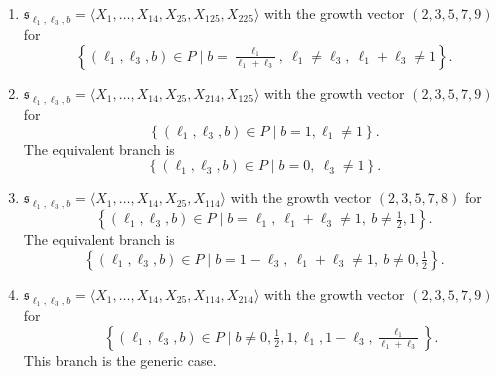 \documentclass{amsart}
\theoremstyle{plain}
\theoremstyle{definition}
\theoremstyle{remark}
\newcommand{\mfk}[1]{\mathfrak{#1}}
\begin{document}
\begin{enumerate}[label=\arabic*)]
\begin{equation*}
        \end{equation*}
        The equivalent branch is
        \[ \left\{ (\ell_1,\ell_3,b) \in P \mid b = 0,\ \ell_3 = 1 \right\}. \]
    \item $\mfk{s}_{\ell_1,\ell_3,b} = \langle X_1, \dots, X_{14}, X_{25}, X_{125}, X_{225} \rangle$ with the growth vector $(2,3,5,7,9)$ for
        \begin{equation*}
            \left\{ (\ell_1,\ell_3,b) \in P \mid b = \tfrac{\ell_1}{\ell_1+\ell_3},\ \ell_1 \neq \ell_3,\ \ell_1 + \ell_3 \neq 1 \right\}.
        \end{equation*}
    \item $\mfk{s}_{\ell_1,\ell_3,b} = \langle X_1, \dots, X_{14}, X_{25}, X_{214}, X_{125} \rangle$ with the growth vector $(2,3,5,7,9)$ for
        \begin{equation*}
            \left\{ (\ell_1,\ell_3,b) \in P \mid b = 1, \ell_1 \neq 1 \right\}.
        \end{equation*}
        The equivalent branch is
        \[ \left\{ (\ell_1,\ell_3,b) \in P \mid b = 0,\ \ell_3 \neq 1 \right\}. \]
    \item $\mfk{s}_{\ell_1,\ell_3,b} = \langle X_1, \dots, X_{14}, X_{25}, X_{114} \rangle$ with the growth vector $(2,3,5,7,8)$ for
        \begin{equation*}
            \left\{ (\ell_1,\ell_3,b) \in P \mid b = \ell_1,\ \ell_1 + \ell_3 \neq 1,\ b \neq \tfrac{1}{2}, 1 \right\}.
        \end{equation*}
        The equivalent branch is
        \[ \left\{ (\ell_1,\ell_3,b) \in P \mid b = 1 - \ell_3,\ \ell_1 + \ell_3 \neq 1,\ b \neq 0, \tfrac 1 2 \right\}. \]
    \item $\mfk{s}_{\ell_1,\ell_3,b} = \langle X_1, \dots, X_{14}, X_{25}, X_{114}, X_{214} \rangle$ with the growth vector $(2,3,5,7,9)$ for
        \begin{equation*}\label{item:branch_generic}
            \quad \left\{ (\ell_1,\ell_3,b) \in P \mid b \neq 0,\tfrac{1}{2},1,\ell_1,1 - \ell_3,\tfrac{\ell_1}{\ell_1+\ell_3} \right\}.
        \end{equation*} 
        This branch is the generic case.
\end{enumerate}
\end{document}
